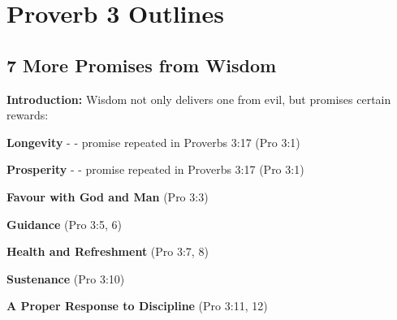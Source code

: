 \section{Proverb 3 Outlines}

\subsection{7 More Promises from Wisdom}
\textbf{Introduction:} Wisdom not only delivers one from evil, but promises certain rewards:
\begin{compactenum}[I.][7]
    \item \textbf{Longevity} - - promise repeated in Proverbs 3:17 (Pro 3:1) 
    \item \textbf{Prosperity} - - promise repeated in Proverbs 3:17 (Pro 3:1) 
    \item \textbf{Favour with God and Man} (Pro 3:3)
    \item \textbf{Guidance} (Pro 3:5, 6)
    \item \textbf{Health and Refreshment} (Pro 3:7, 8)
    \item \textbf{Sustenance} (Pro 3:10)
    \item \textbf{A Proper Response to Discipline} (Pro 3:11, 12)
\end{compactenum}



